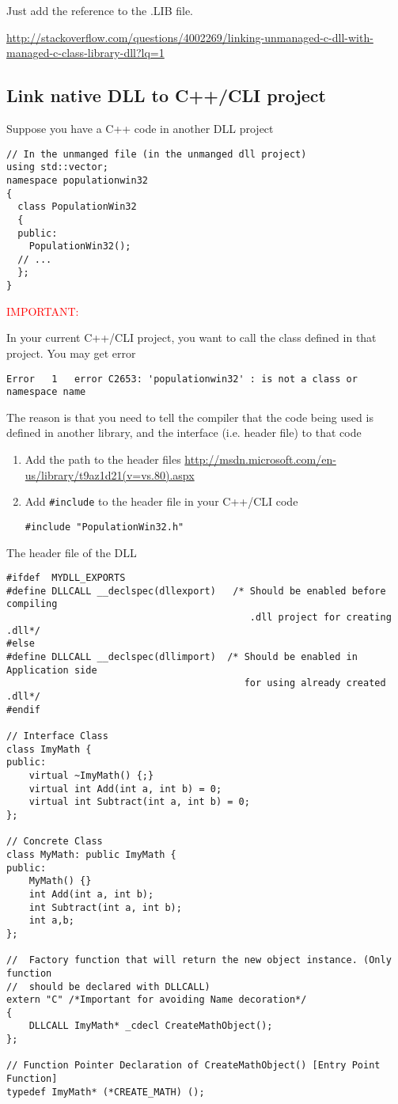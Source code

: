 Just add the reference to the .LIB file.

\url{http://stackoverflow.com/questions/4002269/linking-unmanaged-c-dll-with-managed-c-class-library-dll?lq=1}

\subsection{Link native DLL to C++/CLI  project}

Suppose you have a C++ code in another DLL project
\begin{verbatim}
// In the unmanged file (in the unmanged dll project)
using std::vector;
namespace populationwin32 
{
  class PopulationWin32
  {
  public:
    PopulationWin32();
  // ...
  };
}
\end{verbatim}


\textcolor{red}{IMPORTANT: }

In your current C++/CLI project, you want to call the class defined in that
project. You may get error 
\begin{verbatim}
Error   1   error C2653: 'populationwin32' : is not a class or namespace name
\end{verbatim}

The reason is that you need to tell the compiler that the code being used is
defined in another library, and the interface (i.e. header file) to that code
\begin{enumerate}
  \item Add the path to the header files
\url{http://msdn.microsoft.com/en-us/library/t9az1d21(v=vs.80).aspx}

  \item Add \verb!#include! to the header file in your C++/CLI code
\begin{verbatim}
#include "PopulationWin32.h"
\end{verbatim}
\end{enumerate}


The header file of the DLL
\begin{verbatim}
#ifdef  MYDLL_EXPORTS 
#define DLLCALL __declspec(dllexport)   /* Should be enabled before compiling 
                                           .dll project for creating .dll*/
#else
#define DLLCALL __declspec(dllimport)  /* Should be enabled in Application side
                                          for using already created .dll*/
#endif

// Interface Class
class ImyMath {
public:
    virtual ~ImyMath() {;}
    virtual int Add(int a, int b) = 0;
    virtual int Subtract(int a, int b) = 0;
};

// Concrete Class
class MyMath: public ImyMath {
public:
    MyMath() {}
    int Add(int a, int b);
    int Subtract(int a, int b);
    int a,b;
};

//  Factory function that will return the new object instance. (Only function
//  should be declared with DLLCALL)
extern "C" /*Important for avoiding Name decoration*/
{
    DLLCALL ImyMath* _cdecl CreateMathObject();
};

// Function Pointer Declaration of CreateMathObject() [Entry Point Function]
typedef ImyMath* (*CREATE_MATH) ();
\end{verbatim}

